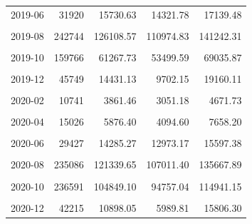 \begin{longtable}[t]{crrrr}
2019-06 & 31920 & 15730.63 & 14321.78 & 17139.48\\
\cellcolor{gray!10}{2019-07} & \cellcolor{gray!10}{63582} & \cellcolor{gray!10}{23784.95} & \cellcolor{gray!10}{22684.78} & \cellcolor{gray!10}{24885.13}\\
2019-08 & 242744 & 126108.57 & 110974.83 & 141242.31\\
\cellcolor{gray!10}{2019-09} & \cellcolor{gray!10}{282749} & \cellcolor{gray!10}{142019.17} & \cellcolor{gray!10}{124903.97} & \cellcolor{gray!10}{159134.37}\\
2019-10 & 159766 & 61267.73 & 53499.59 & 69035.87\\
\cellcolor{gray!10}{2019-11} & \cellcolor{gray!10}{106142} & \cellcolor{gray!10}{44371.37} & \cellcolor{gray!10}{37466.12} & \cellcolor{gray!10}{51276.63}\\
2019-12 & 45749 & 14431.13 & 9702.15 & 19160.11\\
\cellcolor{gray!10}{2020-01} & \cellcolor{gray!10}{15885} & \cellcolor{gray!10}{4586.56} & \cellcolor{gray!10}{2731.63} & \cellcolor{gray!10}{6441.48}\\
2020-02 & 10741 & 3861.46 & 3051.18 & 4671.73\\
\cellcolor{gray!10}{2020-03} & \cellcolor{gray!10}{15543} & \cellcolor{gray!10}{11051.55} & \cellcolor{gray!10}{8805.08} & \cellcolor{gray!10}{13298.02}\\
2020-04 & 15026 & 5876.40 & 4094.60 & 7658.20\\
\cellcolor{gray!10}{2020-05} & \cellcolor{gray!10}{16534} & \cellcolor{gray!10}{7663.12} & \cellcolor{gray!10}{6878.41} & \cellcolor{gray!10}{8447.83}\\
2020-06 & 29427 & 14285.27 & 12973.17 & 15597.38\\
\cellcolor{gray!10}{2020-07} & \cellcolor{gray!10}{71211} & \cellcolor{gray!10}{25886.62} & \cellcolor{gray!10}{24515.00} & \cellcolor{gray!10}{27258.24}\\
2020-08 & 235086 & 121339.65 & 107011.40 & 135667.89\\
\cellcolor{gray!10}{2020-09} & \cellcolor{gray!10}{371618} & \cellcolor{gray!10}{211812.74} & \cellcolor{gray!10}{181817.14} & \cellcolor{gray!10}{241808.33}\\
2020-10 & 236591 & 104849.10 & 94757.04 & 114941.15\\
\cellcolor{gray!10}{2020-11} & \cellcolor{gray!10}{75367} & \cellcolor{gray!10}{23005.57} & \cellcolor{gray!10}{16569.29} & \cellcolor{gray!10}{29441.85}\\
2020-12 & 42215 & 10898.05 & 5989.81 & 15806.30\\

\end{longtable}
